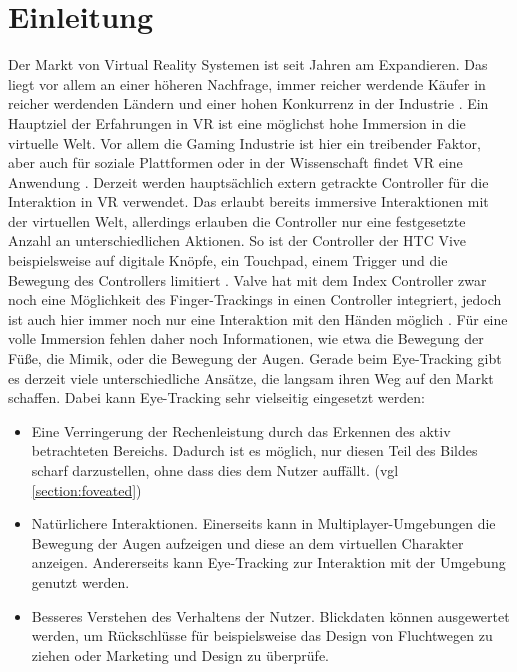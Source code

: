 \chapter{Einleitung}
Der Markt von Virtual Reality Systemen ist seit Jahren am Expandieren. Das liegt vor allem an einer höheren Nachfrage, immer reicher werdende Käufer in reicher werdenden Ländern und einer hohen Konkurrenz in der Industrie \cite{grandview.2020}. Ein Hauptziel der Erfahrungen in \ac{VR} ist eine möglichst hohe Immersion in die virtuelle Welt. Vor allem die Gaming Industrie ist hier ein treibender Faktor, aber auch für soziale Plattformen oder in der Wissenschaft findet \ac{VR} eine Anwendung \cite{grandview.2020}. Derzeit werden hauptsächlich extern getrackte Controller für die Interaktion in \ac{VR} verwendet. Das erlaubt bereits immersive Interaktionen mit der virtuellen Welt, allerdings erlauben die Controller nur eine festgesetzte Anzahl an unterschiedlichen Aktionen. So ist der Controller der HTC Vive beispielsweise auf digitale Knöpfe, ein Touchpad, einem Trigger und die Bewegung des Controllers limitiert \cite{ViveProduct}. Valve hat mit dem Index Controller zwar noch eine Möglichkeit des Finger-Trackings in einen Controller integriert, jedoch ist auch hier immer noch nur eine Interaktion mit den Händen möglich \cite{Index.Controller}. Für eine volle Immersion fehlen daher noch Informationen, wie etwa die Bewegung der Füße, die Mimik, oder die Bewegung der Augen. Gerade beim Eye-Tracking gibt es derzeit viele unterschiedliche Ansätze, die langsam ihren Weg auf den Markt schaffen. Dabei kann Eye-Tracking sehr vielseitig eingesetzt werden:
\begin{itemize}
	\item Eine Verringerung der Rechenleistung durch das Erkennen des aktiv betrachteten Bereichs. Dadurch ist es möglich, nur diesen Teil des Bildes scharf darzustellen, ohne dass dies dem Nutzer auffällt. \cite{Rogers.2019} (vgl \autoref{section:foveated})
	\item Natürlichere Interaktionen. Einerseits kann in Multiplayer-Umgebungen die Bewegung der Augen aufzeigen und diese an dem virtuellen Charakter anzeigen. Andererseits kann Eye-Tracking zur Interaktion mit der Umgebung genutzt werden.\cite{Rogers.2019} 
	\item Besseres Verstehen des Verhaltens der Nutzer. Blickdaten können ausgewertet werden, um Rückschlüsse für beispielsweise das Design von Fluchtwegen zu ziehen oder Marketing und Design zu überprüfe. \cite{Rogers.2019}
\end{itemize}
